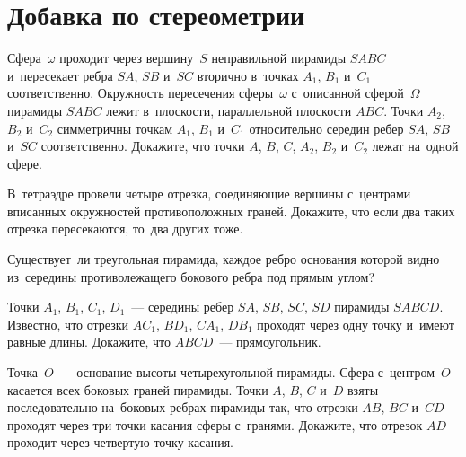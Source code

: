 
\section*{Добавка по стереометрии}


\begin{problems}

\item
Сфера~$\omega$ проходит через вершину~$S$ неправильной пирамиды $SABC$
и~пересекает ребра $SA$, $SB$ и~$SC$ вторично в~точках $A_1$, $B_1$ и~$C_1$
соответственно.
Окружность пересечения сферы~$\omega$ с~описанной сферой~$\Omega$ пирамиды
$SABC$ лежит в~плоскости, параллельной плоскости $ABC$.
Точки $A_2$, $B_2$ и~$C_2$ симметричны точкам $A_1$, $B_1$ и~$C_1$ относительно
середин ребер $SA$, $SB$ и~$SC$ соответственно.
Докажите, что точки $A$, $B$, $C$, $A_2$, $B_2$ и~$C_2$ лежат на~одной сфере.

\item
В~тетраэдре провели четыре отрезка, соединяющие вершины с~центрами вписанных
окружностей противоположных граней.
Докажите, что если два таких отрезка пересекаются, то~два других тоже.

\item
Существует~ли треугольная пирамида, каждое ребро основания которой видно
из~середины противолежащего бокового ребра под прямым углом?

\item
Точки $A_1$, $B_1$, $C_1$, $D_1$~--- середины ребер $SA$, $SB$, $SC$, $SD$
пирамиды $SABCD$.
Известно, что отрезки $A C_1$, $B D_1$, $C A_1$, $D B_1$ проходят через одну
точку и~имеют равные длины.
Докажите, что $ABCD$~--- прямоугольник.

\item
Точка~$O$~--- основание высоты четырехугольной пирамиды.
Сфера с~центром~$O$ касается всех боковых граней пирамиды.
Точки $A$, $B$, $C$ и~$D$ взяты последовательно на~боковых ребрах пирамиды так,
что отрезки $AB$, $BC$ и~$CD$ проходят через три точки касания сферы с~гранями.
Докажите, что отрезок $AD$ проходит через четвертую точку касания.

\end{problems}

